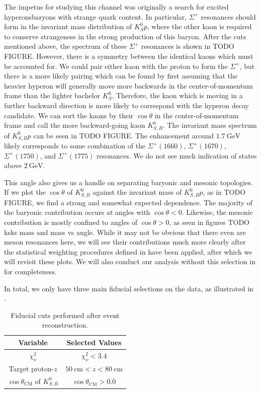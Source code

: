 The impetus for studying this channel was originally a search for excited hyperons\textemdash baryons with strange quark content. In particular, $\Sigma^+$ resonances should form in the invariant mass distribution of $K_S^0 p$, where the other kaon is required to conserve strangeness in the strong production of this baryon. After the cuts mentioned above, the spectrum of these $\Sigma^+$ resonances is shown in {\color{red}TODO FIGURE}. However, there is a symmetry between the identical kaons which must be accounted for. We could pair either kaon with the proton to form the $\Sigma^+$, but there is a more likely pairing which can be found by first assuming that the heavier hyperon will generally move more backwards in the center-of-momentum frame than the lighter bachelor $K_S^0$. Therefore, the kaon which is moving in a further backward direction is more likely to correspond with the hyperon decay candidate. We can sort the kaons by their $\cos\theta$ in the center-of-momentum frame and call the more backward-going kaon $K_{S,B}^0$. The invariant mass spectrum of $K_{S,B}^0 p$ can be seen in {\color{red}TODO FIGURE}. The enhancement around $\SI{1.7}{\giga\electronvolt}$ likely corresponds to some combination of the $\Sigma^+(1660)$, $\Sigma^+(1670)$, $\Sigma^+(1750)$, and $\Sigma^+(1775)$ resonances. We do not see much indication of states above $\SI{2}{\giga\electronvolt}$.

This angle also gives us a handle on separating baryonic and mesonic topologies. If we plot the $\cos\theta$ of $K_{S,B}^0$ against the invariant mass of $K_{S,B}^0 p$, as in {\color{red}TODO FIGURE}, we find a strong and somewhat expected dependence. The majority of the baryonic contribution occurs at angles with $\cos\theta < 0$. Likewise, the mesonic contribution is mostly confined to angles of $\cos\theta > 0$, as seen in figures {\color{red}TODO ksks mass and mass vs angle}. While it may not be obvious that there even are meson resonances here, we will see their contributions much more clearly after the statistical weighting procedures defined in  have been applied, after which we will revisit these plots. We will also conduct our analysis without this selection in  for completeness.

In total, we only have three main fiducial selections on the data, as illustrated in .

\begin{table}
  \begin{center}
    \begin{tabular}{cc}\toprule
      Variable & Selected Values \\\midrule
      $\chi^2_\nu$ & $\chi^2_\nu < 3.4$ \\
      Target proton-$z$ & $\SI{50}{\centi\meter} < z < \SI{80}{\centi\meter}$ \\\bottomrule
      $\cos\theta_{\text{CM}}$ of $K_{S,B}^0$ & $ \cos\theta_{\text{CM}} > 0.0 $
    \end{tabular}
    \caption{Fiducial cuts performed after event reconstruction.}\label{tab:fiducial-cuts}
  \end{center}
\end{table}
